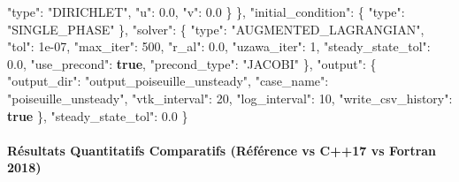 \documentclass[
  10pt,
]{article}
\newenvironment{Shaded}{}{}
\newcommand{\DataTypeTok}[1]{\textcolor[rgb]{0.56,0.13,0.00}{#1}}
\newcommand{\DecValTok}[1]{\textcolor[rgb]{0.25,0.63,0.44}{#1}}
\newcommand{\FloatTok}[1]{\textcolor[rgb]{0.25,0.63,0.44}{#1}}
\newcommand{\FunctionTok}[1]{\textcolor[rgb]{0.02,0.16,0.49}{#1}}
\newcommand{\KeywordTok}[1]{\textcolor[rgb]{0.00,0.44,0.13}{\textbf{#1}}}
\newcommand{\StringTok}[1]{\textcolor[rgb]{0.25,0.44,0.63}{#1}}
\begin{document}
\begin{Shaded}
\begin{Highlighting}[]
      \DataTypeTok{"type"}\FunctionTok{:} \StringTok{"DIRICHLET"}\FunctionTok{,}
      \DataTypeTok{"u"}\FunctionTok{:} \FloatTok{0.0}\FunctionTok{,}
      \DataTypeTok{"v"}\FunctionTok{:} \FloatTok{0.0}
    \FunctionTok{\}}
  \FunctionTok{\},}
  \DataTypeTok{"initial\_condition"}\FunctionTok{:} \FunctionTok{\{}
    \DataTypeTok{"type"}\FunctionTok{:} \StringTok{"SINGLE\_PHASE"}
  \FunctionTok{\},}
  \DataTypeTok{"solver"}\FunctionTok{:} \FunctionTok{\{}
    \DataTypeTok{"type"}\FunctionTok{:} \StringTok{"AUGMENTED\_LAGRANGIAN"}\FunctionTok{,}
    \DataTypeTok{"tol"}\FunctionTok{:} \DecValTok{1e{-}07}\FunctionTok{,}
    \DataTypeTok{"max\_iter"}\FunctionTok{:} \DecValTok{500}\FunctionTok{,}
    \DataTypeTok{"r\_al"}\FunctionTok{:} \FloatTok{0.0}\FunctionTok{,}
    \DataTypeTok{"uzawa\_iter"}\FunctionTok{:} \DecValTok{1}\FunctionTok{,}
    \DataTypeTok{"steady\_state\_tol"}\FunctionTok{:} \FloatTok{0.0}\FunctionTok{,}
    \DataTypeTok{"use\_precond"}\FunctionTok{:} \KeywordTok{true}\FunctionTok{,}
    \DataTypeTok{"precond\_type"}\FunctionTok{:} \StringTok{"JACOBI"}
  \FunctionTok{\},}
  \DataTypeTok{"output"}\FunctionTok{:} \FunctionTok{\{}
    \DataTypeTok{"output\_dir"}\FunctionTok{:} \StringTok{"output\_poiseuille\_unsteady"}\FunctionTok{,}
    \DataTypeTok{"case\_name"}\FunctionTok{:} \StringTok{"poiseuille\_unsteady"}\FunctionTok{,}
    \DataTypeTok{"vtk\_interval"}\FunctionTok{:} \DecValTok{20}\FunctionTok{,}
    \DataTypeTok{"log\_interval"}\FunctionTok{:} \DecValTok{10}\FunctionTok{,}
    \DataTypeTok{"write\_csv\_history"}\FunctionTok{:} \KeywordTok{true}
  \FunctionTok{\},}
  \DataTypeTok{"steady\_state\_tol"}\FunctionTok{:} \FloatTok{0.0}
\FunctionTok{\}}
\end{Highlighting}
\end{Shaded}

\paragraph{Résultats Quantitatifs Comparatifs (Référence vs C++17 vs
Fortran
2018)}\label{ruxe9sultats-quantitatifs-comparatifs-ruxe9fuxe9rence-vs-c17-vs-fortran-2018-2}
\end{document}
